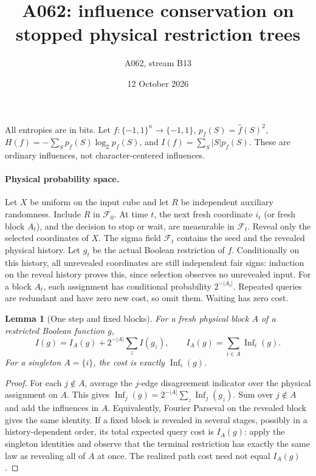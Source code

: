 \documentclass{article}
\newtheorem{lemma}{Lemma}
\begin{document}
\title{A062: influence conservation on stopped physical restriction trees}
\author{A062, stream B13}\date{12 October 2026}\maketitle
All entropies are in bits. Let $f:\{-1,1\}^n\to\{-1,1\}$,
$p_f(S)=\widehat f(S)^2$, $H(f)=-\sum_Sp_f(S)\log_2p_f(S)$,
and $I(f)=\sum_S|S|p_f(S)$. These are ordinary influences, not
character-centered influences.

\paragraph{Physical probability space.}
Let $X$ be uniform on the input cube and let $R$ be independent auxiliary
randomness. Include $R$ in $\mathcal F_0$. At time $t$, the next fresh
coordinate $i_t$ (or fresh block $A_t$), and the decision to stop or wait,
are measurable in $\mathcal F_t$. Reveal only the selected coordinates of
$X$. The sigma field $\mathcal F_t$ contains the seed and the revealed
physical history. Let $g_t$ be the actual Boolean restriction of $f$.
Conditionally on this history, all unrevealed coordinates are still
independent fair signs: induction on the reveal history proves this,
since selection observes no unrevealed input. For a block $A_t$, each
assignment has conditional probability $2^{-|A_t|}$. Repeated queries
are redundant and have zero new cost, so omit them. Waiting has zero cost.

\begin{lemma}[One step and fixed blocks]
For a fresh physical block $A$ of a restricted Boolean function $g$,
\[
 I(g)=I_A(g)+2^{-|A|}\sum_z I(g_z),\qquad
 I_A(g)=\sum_{i\in A}\operatorname{Inf}_i(g).
\]
For a singleton $A=\{i\}$, the cost is exactly $\operatorname{Inf}_i(g)$.
\end{lemma}
\begin{proof}
For each $j\notin A$, average the $j$-edge disagreement indicator over
the physical assignment on $A$. This gives
$\operatorname{Inf}_j(g)=2^{-|A|}\sum_z\operatorname{Inf}_j(g_z)$.
Sum over $j\notin A$ and add the influences in $A$.
Equivalently, Fourier Parseval on the revealed block gives the same
identity. If a fixed block is revealed in several stages, possibly in a
history-dependent order, its total expected query cost is $I_A(g)$:
apply the singleton identities and observe that the terminal restriction
has exactly the same law as revealing all of $A$ at once. The realized
path cost need not equal $I_A(g)$.
\end{proof}
\end{document}
